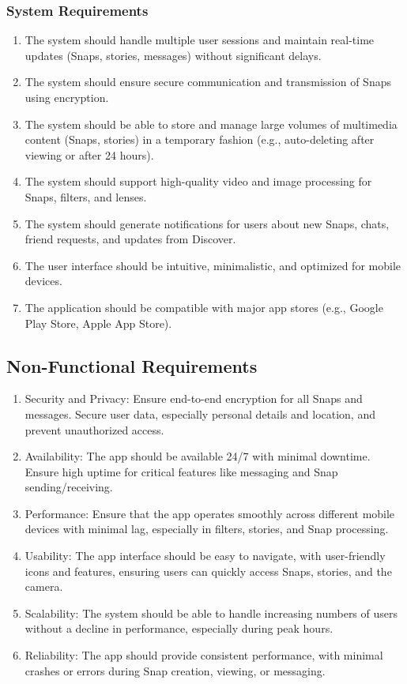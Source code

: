 \documentclass{article}
\begin{document}
\subsubsection{System Requirements}
\begin{enumerate}
    \item The system should handle multiple user sessions and maintain real-time updates (Snaps, stories, messages) without significant delays.
    \item The system should ensure secure communication and transmission of Snaps using encryption.
    \item The system should be able to store and manage large volumes of multimedia content (Snaps, stories) in a temporary fashion (e.g., auto-deleting after viewing or after 24 hours).
    \item The system should support high-quality video and image processing for Snaps, filters, and lenses.
    \item The system should generate notifications for users about new Snaps, chats, friend requests, and updates from Discover.
    \item The user interface should be intuitive, minimalistic, and optimized for mobile devices.
    \item The application should be compatible with major app stores (e.g., Google Play Store, Apple App Store).
\end{enumerate}


\subsection{Non-Functional Requirements}
\begin{enumerate}
    \item Security and Privacy: Ensure end-to-end encryption for all Snaps and messages. Secure user data, especially personal details and location, and prevent unauthorized access.
    \item Availability: The app should be available 24/7 with minimal downtime. Ensure high uptime for critical features like messaging and Snap sending/receiving.
    \item Performance: Ensure that the app operates smoothly across different mobile devices with minimal lag, especially in filters, stories, and Snap processing.
    \item Usability: The app interface should be easy to navigate, with user-friendly icons and features, ensuring users can quickly access Snaps, stories, and the camera.
    \item Scalability: The system should be able to handle increasing numbers of users without a decline in performance, especially during peak hours.
    \item Reliability: The app should provide consistent performance, with minimal crashes or errors during Snap creation, viewing, or messaging.
\end{enumerate}
 
\end{document}
